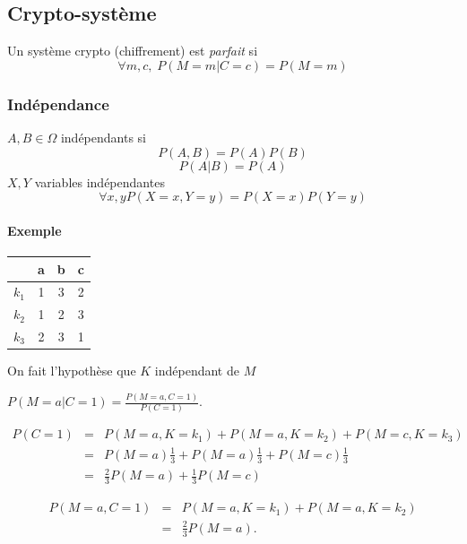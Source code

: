 \documentclass[12pt,a4paper]{article}
\begin{document}
\subsection{Crypto-système}
Un système crypto (chiffrement) est {\em parfait} si 
\begin{displaymath}
\forall m, c, \; P(M=m|C=c)=P(M=m)
\end{displaymath}

\subsubsection{Indépendance}
$A,B \in \Omega$ indépendants si
\begin{displaymath}
P(A,B)=P(A)P(B)
\end{displaymath}
\begin{displaymath}
P(A|B)=P(A)
\end{displaymath}
$X,Y$ variables indépendantes
\begin{displaymath}
\forall x,y  P(X=x,Y=y)=P(X=x)P(Y=y)
\end{displaymath}

\paragraph{Exemple}

\begin{tabular}{|c|c|c|c|}
\hline  & a & b & c \\ 
\hline $k_1$ & 1 & 3 & 2 \\ 
\hline $k_2$ & 1 & 2 & 3 \\ 
\hline $k_3$ & 2 & 3 & 1 \\ 
\hline 
\end{tabular} 

\bigskip
On fait  l'hypothèse que $K$ indépendant de $M$

$P(M=a|C=1)=\frac{P(M=a,C=1)}{P(C=1)}$.

\medskip

\begin{eqnarray*}
  P(C=1) &=& P(M=a,K=k_1)+P(M=a,K=k_2)+P(M=c,K=k_3)\\
         &=& P(M=a)\frac{1}{3}+P(M=a)\frac{1}{3}+P(M=c)\frac{1}{3}\\
         &=& \frac{2}{3}P(M=a)+\frac{1}{3}P(M=c)
\end{eqnarray*}


\begin{eqnarray*}
  P(M=a,C=1) &=& P(M=a,K=k_1)+P(M=a,K=k_2)\\
             &=& \frac{2}{3}P(M=a).
\end{eqnarray*}
\end{document}
